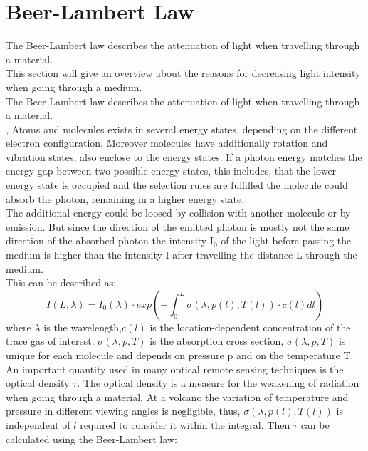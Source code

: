 \documentclass  [
  paper    = a4,
  BCOR     = 10mm,
  twoside,
  fontsize = 12pt,
  fleqn,
  toc      = bibnumbered,
  toc      = listofnumbered,
  numbers  = noendperiod,
  headings = normal,
  listof   = leveldown,
  version  = 3.03
]                                       {scrreprt}
\begin{document}
	\section*{Beer-Lambert Law}
	The Beer-Lambert law describes the attenuation of light when travelling through a material.\\
	This section will give an overview about the reasons for decreasing light intensity when going through a medium.\\
	The Beer-Lambert law describes the attenuation of light when travelling through a material.\\
                                                                                                                                                                                                                                                                                       ,
	Atoms and molecules exists in several energy states, depending on the different electron configuration. Moreover molecules have additionally rotation and vibration states, also enclose to the energy states. If a photon energy matches the energy gap between two possible energy states, this includes, that the lower energy state is occupied and the selection rules are fulfilled  the molecule could absorb the photon, remaining in a higher energy state.\\
	The additional energy could be loosed by collision with another molecule or by emission. But since the direction of the emitted photon is mostly not the same direction of the absorbed photon the intensity I$_{0}$ of the light before passing the medium is higher than the intensity I after travelling the distance L through the medium.\\
	This can be described as:\\ 
	\begin{equation}
	I\left(L,\lambda\right) = I_{0}\left(\lambda\right)\cdot exp\left(-\int^{L}_{0}\sigma\left(\lambda,p(l),T(l)\right)\cdot c\left(l\right)dl\right)
	\end{equation}
	where $\lambda$ is the wavelength,$c\left(l\right)$ is the location-dependent concentration of the trace gas of interest. $\sigma\left(\lambda,p,T\right)$ is the absorption cross section, $\sigma\left(\lambda,p,T\right)$ is unique for each molecule and depends on pressure p and on the temperature T.\\
	An important quantity used in many optical remote sensing techniques is the optical density $\tau$. The optical density is a measure for the weakening of radiation when going through a material. At a volcano the variation of temperature and pressure in different viewing angles is negligible, thus, $\sigma\left(\lambda,p(l),T(l)\right)$ is independent of $l$ required to consider it within the integral. Then  $\tau$ can be calculated using the Beer-Lambert law:
\end{document}
